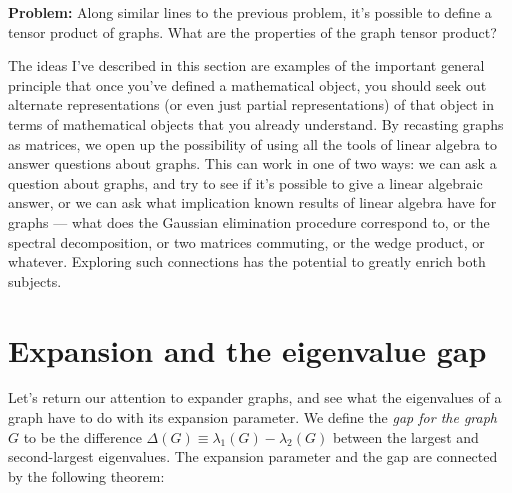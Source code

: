 \documentclass[12pt]{article}
\begin{document}
\textbf{Problem:} Along similar lines to the previous problem, it's
possible to define a tensor product of graphs.  What are the
properties of the graph tensor product?

The ideas I've described in this section are examples of the important
general principle that once you've defined a mathematical object, you
should seek out alternate representations (or even just partial
representations) of that object in terms of mathematical objects that
you already understand.  By recasting graphs as matrices, we open up
the possibility of using all the tools of linear algebra to answer
questions about graphs.  This can work in one of two ways: we can ask
a question about graphs, and try to see if it's possible to give a
linear algebraic answer, or we can ask what implication known results
of linear algebra have for graphs --- what does the Gaussian
elimination procedure correspond to, or the spectral decomposition, or
two matrices commuting, or the wedge product, or whatever.  Exploring
such connections has the potential to greatly enrich both subjects.




\section{Expansion and the eigenvalue gap}

Let's return our attention to expander graphs, and see what the
eigenvalues of a graph have to do with its expansion parameter.  We
define the \emph{gap for the graph $G$} to be the difference
$\Delta(G) \equiv \lambda_1(G)-\lambda_2(G)$ between the largest and
second-largest eigenvalues.  The expansion parameter and the gap are
connected by the following theorem:
\end{document}
